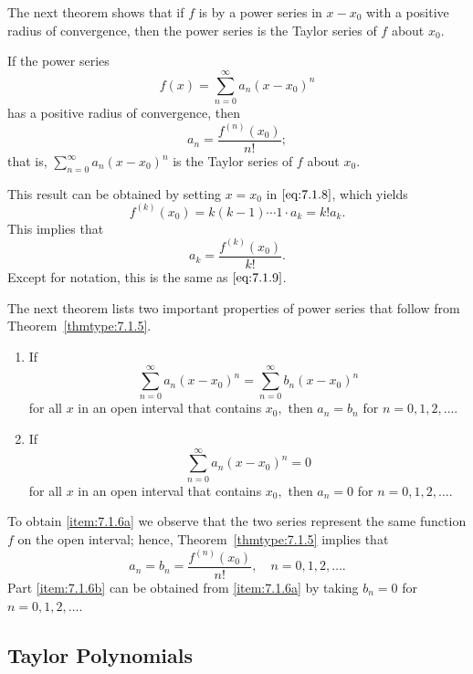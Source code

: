 \documentclass{ximera}
\begin{document}
The next theorem shows that if $f$ is  by a power
series in $x-x_0$ with a positive radius of convergence, then the power
series is the Taylor series of $f$ about $x_0$.

\begin{theorem}\label{thmtype:7.1.5}
If the power series
$$
f(x)=\sum_{n=0}^\infty a_n(x-x_0)^n
$$
has a positive radius of convergence, then
\begin{equation} \label{eq:7.1.9}
a_n=\frac{f^{(n)}(x_0)}{n!};
\end{equation}
that is, $\sum_{n=0}^\infty a_n(x-x_0)^n$ is the Taylor
series of $f$ about $x_0$.
\end{theorem}

This result can be obtained by setting $x=x_0$ in
$\eqref{eq:7.1.8}$, which yields
$$
f^{(k)}(x_0)=k(k-1)\cdots1\cdot a_k=k!a_k.
$$
This implies that
$$
a_k=\frac{f^{(k)}(x_0)}{k!}.
$$
Except for notation, this is the same as $\eqref{eq:7.1.9}$.

The next theorem lists two important properties of power series that follow from Theorem~\ref{thmtype:7.1.5}.

\begin{theorem}\label{thmtype:7.1.6}
\begin{enumerate}
\item\label{item:7.1.6a} %
If
$$
\sum_{n=0}^\infty a_n(x-x_0)^n=\sum_{n=0}^\infty b_n(x-x_0)^n
$$
for all $x$  in an open interval that contains $x_0,$ then
$a_n=b_n$ for $n=0, 1, 2, \dots$.
\item\label{item:7.1.6b} %
If
$$
\sum_{n=0}^\infty a_n(x-x_0)^n=0
$$
 for all $x$ in
an open interval that contains $x_0,$ then $a_n=0$ for
$n=0, 1, 2, \dots$.
\end{enumerate}
\end{theorem}

To obtain \ref{item:7.1.6a} we observe that the two series represent the same function $f$ on the open  interval; hence, Theorem~\ref{thmtype:7.1.5}
implies that
$$
a_n=b_n=\frac{f^{(n)}(x_0)}{n!},\quad n=0,1,2, \dots.
$$
Part \ref{item:7.1.6b}  can be obtained from \ref{item:7.1.6a} by taking $b_n=0$ for
$n=0, 1, 2, \dots$.

\subsection*{Taylor Polynomials}
\end{document}
